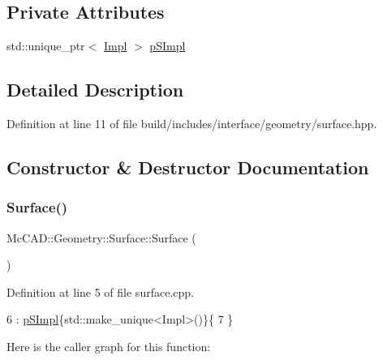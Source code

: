 \subsection*{Private Attributes}
\begin{DoxyCompactItemize}
\item 
std\+::unique\+\_\+ptr$<$ \hyperlink{classMcCAD_1_1Geometry_1_1Surface_1_1Impl}{Impl} $>$ \hyperlink{classMcCAD_1_1Geometry_1_1Surface_a0097d4e9bfc1c7cd7cd33d81492b9100}{p\+S\+Impl}
\end{DoxyCompactItemize}


\subsection{Detailed Description}


Definition at line 11 of file build/includes/interface/geometry/surface.\+hpp.



\subsection{Constructor \& Destructor Documentation}
\mbox{\label{classMcCAD_1_1Geometry_1_1Surface_af8c5757177e043d499b55b9e1d065a66}} 
\subsubsection{\texorpdfstring{Surface()}{Surface()}\hspace{0.1cm}{\footnotesize\ttfamily [1/2]}}
{\footnotesize\ttfamily Mc\+C\+A\+D\+::\+Geometry\+::\+Surface\+::\+Surface (\begin{DoxyParamCaption}{ }\end{DoxyParamCaption})}



Definition at line 5 of file surface.\+cpp.


\begin{DoxyCode}
6   : \hyperlink{classMcCAD_1_1Geometry_1_1Surface_a0097d4e9bfc1c7cd7cd33d81492b9100}{pSImpl}\{std::make\_unique<Impl>()\}\{
7 \}
\end{DoxyCode}
Here is the caller graph for this function\+:
\mbox{\label{classMcCAD_1_1Geometry_1_1Surface_a0519721d6a29d0d142133c91b7fceeb2}} 

